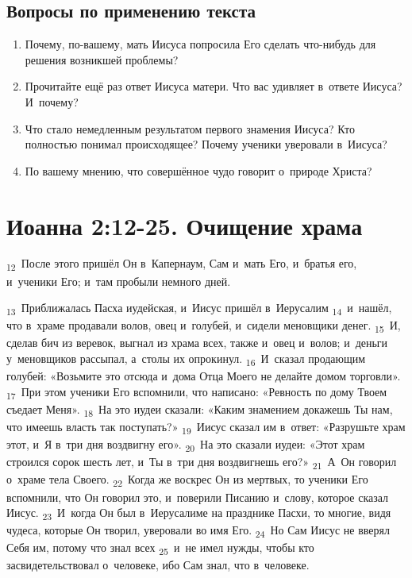 \documentclass[a4paper,12pt]{article}
\begin{document}
\subsection*{Вопросы по применению текста} 
\begin{enumerate}
    \item Почему, по-вашему, мать Иисуса попросила Его сделать что-нибудь для решения возникшей проблемы? 
    
    \myline
    
    \myline
    \item Прочитайте ещё раз ответ Иисуса матери. Что вас удивляет в~ответе Иисуса? И~почему? 
    
    \myline
    
    \myline
    \item Что стало немедленным результатом первого знамения Иисуса? Кто полностью понимал происходящее? Почему ученики уверовали в~Иисуса? 
    
    \myline
    
    \myline
    \item По вашему мнению, что совершённое чудо говорит о~природе Христа? 

    \myline
    
    \myline
\end{enumerate}



\section{Иоанна 2:12-25. Очищение храма}

\textsubscript{12}~После этого пришёл Он в~Капернаум, Сам и~мать Его, и~братья его, и~ученики Его; и~там пробыли немного дней. 

\textsubscript{13}~Приближалась Пасха иудейская, и~Иисус пришёл в~Иерусалим
\textsubscript{14}~и~нашёл, что в~храме продавали волов, овец и~голубей, и~сидели меновщики денег.
\textsubscript{15}~И, сделав бич из веревок, выгнал из храма всех, также и~овец и~волов; и~деньги у~меновщиков рассыпал, а~столы их опрокинул.
\textsubscript{16}~И~сказал продающим голубей: «Возьмите это отсюда и~дома Отца Моего не делайте домом торговли».
\textsubscript{17}~При этом ученики Его вспомнили, что написано: «Ревность по дому Твоем съедает Меня».
\textsubscript{18}~На это иудеи сказали: «Каким знамением докажешь Ты нам, что имеешь власть так поступать?»
\textsubscript{19}~Иисус сказал им в~ответ: «Разрушьте храм этот, и~Я в~три дня воздвигну его».
\textsubscript{20}~На это сказали иудеи: «Этот храм строился сорок шесть лет, и~Ты в~три дня воздвигнешь его?»
\textsubscript{21}~А~Он говорил о~храме тела Своего.
\textsubscript{22}~Когда же воскрес Он из мертвых, то ученики Его вспомнили, что Он говорил это, и~поверили Писанию и~слову, которое сказал Иисус.
\textsubscript{23}~И~когда Он был в~Иерусалиме на празднике Пасхи, то многие, видя чудеса, которые Он творил, уверовали во имя Его.
\textsubscript{24}~Но Сам Иисус не вверял Себя им, потому что знал всех
\textsubscript{25}~и~не имел нужды, чтобы кто засвидетельствовал о~человеке, ибо Сам знал, что в~человеке.
\end{document}
